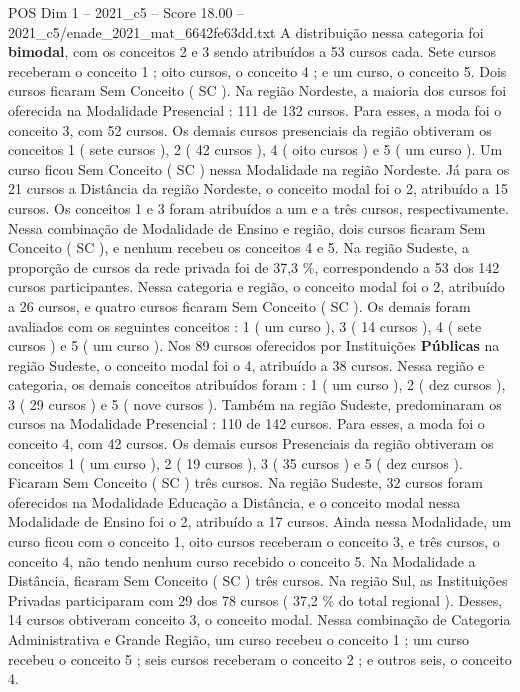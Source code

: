 \begin{textsample}{POS Dim 1 – 2021\_c5 – Score 18.00 – 2021\_c5/enade\_2021\_mat\_6642fe63dd.txt}
A distribuição nessa categoria foi \textbf{bimodal}, com os conceitos 2 e 3 sendo atribuídos a 53 cursos cada.
Sete cursos receberam o conceito 1 ; oito cursos, o conceito 4 ; e um curso, o conceito 5.
Dois cursos ficaram Sem Conceito ( SC ).
Na região Nordeste, a maioria dos cursos foi oferecida na Modalidade Presencial : 111 de 132 cursos.
Para esses, a moda foi o conceito 3, com 52 cursos.
Os demais cursos presenciais da região obtiveram os conceitos 1 ( sete cursos ), 2 ( 42 cursos ), 4 ( oito cursos ) e 5 ( um curso ).
Um curso ficou Sem Conceito ( SC ) nessa Modalidade na região Nordeste.
Já para os 21 cursos a Distância da região Nordeste, o conceito modal foi o 2, atribuído a 15 cursos.
Os conceitos 1 e 3 foram atribuídos a um e a três cursos, respectivamente.
Nessa combinação de Modalidade de Ensino e região, dois cursos ficaram Sem Conceito ( SC ), e nenhum recebeu os conceitos 4 e 5.
Na região Sudeste, a proporção de cursos da rede privada foi de 37,3 \%, correspondendo a 53 dos 142 cursos participantes.
Nessa categoria e região, o conceito modal foi o 2, atribuído a 26 cursos, e quatro cursos ficaram Sem Conceito ( SC ).
Os demais foram avaliados com os seguintes conceitos : 1 ( um curso ), 3 ( 14 cursos ), 4 ( sete cursos ) e 5 ( um curso ).
Nos 89 cursos oferecidos por Instituições \textbf{Públicas} na região Sudeste, o conceito modal foi o 4, atribuído a 38 cursos.
Nessa região e categoria, os demais conceitos atribuídos foram : 1 ( um curso ), 2 ( dez cursos ), 3 ( 29 cursos ) e 5 ( nove cursos ).
Também na região Sudeste, predominaram os cursos na Modalidade Presencial : 110 de 142 cursos.
Para esses, a moda foi o conceito 4, com 42 cursos.
Os demais cursos Presenciais da região obtiveram os conceitos 1 ( um curso ), 2 ( 19 cursos ), 3 ( 35 cursos ) e 5 ( dez cursos ).
Ficaram Sem Conceito ( SC ) três cursos.
Na região Sudeste, 32 cursos foram oferecidos na Modalidade Educação a Distância, e o conceito modal nessa Modalidade de Ensino foi o 2, atribuído a 17 cursos.
Ainda nessa Modalidade, um curso ficou com o conceito 1, oito cursos receberam o conceito 3, e três cursos, o conceito 4, não tendo nenhum curso recebido o conceito 5.
Na Modalidade a Distância, ficaram Sem Conceito ( SC ) três cursos.
Na região Sul, as Instituições Privadas participaram com 29 dos 78 cursos ( 37,2 \% do total regional ).
Desses, 14 cursos obtiveram conceito 3, o conceito modal.
Nessa combinação de Categoria Administrativa e Grande Região, um curso recebeu o conceito 1 ; um curso recebeu o conceito 5 ; seis cursos receberam o conceito 2 ; e outros seis, o conceito 4.

\end{textsample}
